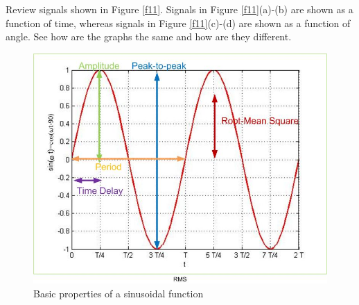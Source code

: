 \documentclass{ximera}
\begin{document}
Review signals shown in Figure \ref{f11}. Signals in Figure \ref{f11}(a)-(b) are shown as a function of time, whereas signals in Figure \ref{f11}(c)-(d) are shown as a function of angle. See how are the graphs the same and how are they different. 

\begin{figure}[htbp]
\includegraphics{../jpg/sinusoid.jpg}
\caption{\label{sinusoid} Basic properties of a sinusoidal function}
\end{figure} 
\end{document}

